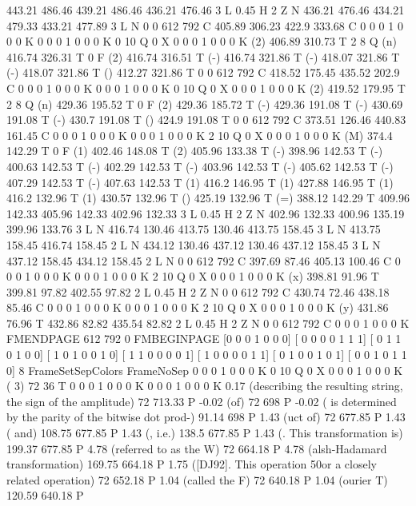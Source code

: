 443.21 486.46 439.21 486.46 436.21 476.46 3 L
0.45 H
2 Z
N
436.21 476.46 434.21 479.33 433.21 477.89 3 L
N
0 0 612 792 C
405.89 306.23 422.9 333.68 C
0 0 0 1 0 0 0 K
0 0 0 1 0 0 0 K
0 10 Q
0 X
0 0 0 1 0 0 0 K
(2) 406.89 310.73 T
2 8 Q
(n) 416.74 326.31 T
0 F
(2) 416.74 316.51 T
(-) 416.74 321.86 T
(-) 418.07 321.86 T
(-) 418.07 321.86 T
() 412.27 321.86 T
0 0 612 792 C
418.52 175.45 435.52 202.9 C
0 0 0 1 0 0 0 K
0 0 0 1 0 0 0 K
0 10 Q
0 X
0 0 0 1 0 0 0 K
(2) 419.52 179.95 T
2 8 Q
(n) 429.36 195.52 T
0 F
(2) 429.36 185.72 T
(-) 429.36 191.08 T
(-) 430.69 191.08 T
(-) 430.7 191.08 T
() 424.9 191.08 T
0 0 612 792 C
373.51 126.46 440.83 161.45 C
0 0 0 1 0 0 0 K
0 0 0 1 0 0 0 K
2 10 Q
0 X
0 0 0 1 0 0 0 K
(M) 374.4 142.29 T
0 F
(1) 402.46 148.08 T
(2) 405.96 133.38 T
(-) 398.96 142.53 T
(-) 400.63 142.53 T
(-) 402.29 142.53 T
(-) 403.96 142.53 T
(-) 405.62 142.53 T
(-) 407.29 142.53 T
(-) 407.63 142.53 T
(1) 416.2 146.95 T
(1) 427.88 146.95 T
(1) 416.2 132.96 T
(1) 430.57 132.96 T
() 425.19 132.96 T
(=) 388.12 142.29 T
409.96 142.33 405.96 142.33 402.96 132.33 3 L
0.45 H
2 Z
N
402.96 132.33 400.96 135.19 399.96 133.76 3 L
N
416.74 130.46 413.75 130.46 413.75 158.45 3 L
N
413.75 158.45 416.74 158.45 2 L
N
434.12 130.46 437.12 130.46 437.12 158.45 3 L
N
437.12 158.45 434.12 158.45 2 L
N
0 0 612 792 C
397.69 87.46 405.13 100.46 C
0 0 0 1 0 0 0 K
0 0 0 1 0 0 0 K
2 10 Q
0 X
0 0 0 1 0 0 0 K
(x) 398.81 91.96 T
399.81 97.82 402.55 97.82 2 L
0.45 H
2 Z
N
0 0 612 792 C
430.74 72.46 438.18 85.46 C
0 0 0 1 0 0 0 K
0 0 0 1 0 0 0 K
2 10 Q
0 X
0 0 0 1 0 0 0 K
(y) 431.86 76.96 T
432.86 82.82 435.54 82.82 2 L
0.45 H
2 Z
N
0 0 612 792 C
0 0 0 1 0 0 0 K
FMENDPAGE
612 792 0 FMBEGINPAGE
[0 0 0 1 0 0 0]
[ 0 0 0 0 1 1 1]
[ 0 1 1 0 1 0 0]
[ 1 0 1 0 0 1 0]
[ 1 1 0 0 0 0 1]
[ 1 0 0 0 0 1 1]
[ 0 1 0 0 1 0 1]
[ 0 0 1 0 1 1 0]
 8 FrameSetSepColors
FrameNoSep
0 0 0 1 0 0 0 K
0 10 Q
0 X
0 0 0 1 0 0 0 K
(                                                                                        3) 72 36 T
0 0 0 1 0 0 0 K
0 0 0 1 0 0 0 K
0.17 (describing the resulting string, the sign of the amplitude) 72 713.33 P
-0.02 (of) 72 698 P
-0.02 ( is determined by the parity of the bitwise dot prod-) 91.14 698 P
1.43 (uct of) 72 677.85 P
1.43 ( and) 108.75 677.85 P
1.43 (, i.e.) 138.5 677.85 P
1.43 (. This transformation is) 199.37 677.85 P
4.78 (referred to as the W) 72 664.18 P
4.78 (alsh-Hadamard transformation) 169.75 664.18 P
1.75 ([DJ92]. This operation \050or a closely related operation) 72 652.18 P
1.04 (called the F) 72 640.18 P
1.04 (ourier T) 120.59 640.18 P
